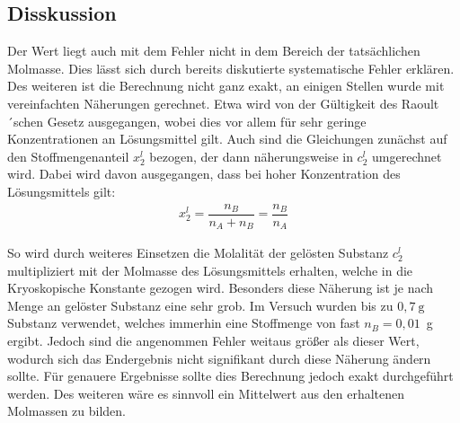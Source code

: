\documentclass[12pt,a4paper,titlepage,headinclude,bibtotoc]{scrartcl}
\begin{document}
\subsection{Disskussion} 
Der Wert liegt auch mit dem Fehler nicht in dem Bereich der tatsächlichen Molmasse. Dies lässt sich durch bereits diskutierte systematische Fehler erklären. Des weiteren ist die Berechnung nicht ganz exakt, an einigen Stellen wurde mit vereinfachten Näherungen gerechnet. Etwa wird von der Gültigkeit des Raoult´schen Gesetz ausgegangen, wobei dies vor allem für sehr geringe Konzentrationen an Lösungsmittel gilt. Auch sind die Gleichungen zunächst auf den Stoffmengenanteil $x_2^l$ bezogen, der dann näherungsweise in $c_2^l$ umgerechnet wird. Dabei wird davon ausgegangen, dass bei hoher Konzentration des Lösungsmittels gilt:
\begin{align}
x_2^l = \dfrac{n_B}{n_A + n_B} = \dfrac{n_B}{n_A}
\end{align}   

So wird durch weiteres Einsetzen die Molalität der gelösten Substanz $c_2^l$ multipliziert mit der Molmasse des Lösungsmittels erhalten, welche in die Kryoskopische Konstante gezogen wird. Besonders diese Näherung ist je nach Menge an gelöster Substanz eine sehr grob. Im Versuch wurden bis zu $0,7{~}\mathrm{g}$ Substanz verwendet, welches immerhin eine Stoffmenge von fast $n_B = 0,01${~}g ergibt. Jedoch sind die angenommen Fehler weitaus größer als dieser Wert, wodurch sich das Endergebnis nicht signifikant durch diese Näherung ändern sollte. Für genauere Ergebnisse sollte dies Berechnung jedoch exakt durchgeführt werden. Des weiteren wäre es sinnvoll ein Mittelwert aus den erhaltenen Molmassen zu bilden.  
 


 
\end{document}
